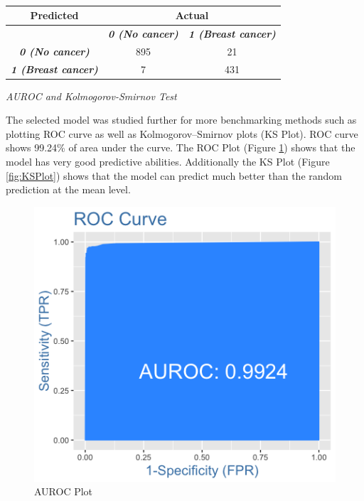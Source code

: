 \documentclass{bioinfo}
\begin{document}
\begin{table}[htb]
\centering
\caption{}
\label{tab:conf-matrix}
\begin{tabular}{@{}ccc@{}}
\toprule
\textbf{Predicted}                  & \multicolumn{2}{c}{\textbf{Actual}}                                   \\ \midrule
\textit{\textbf{}}                  & \textit{\textbf{0 (No cancer)}} & \textit{\textbf{1 (Breast cancer)}} \\
\textit{\textbf{0 (No cancer)}}     & 895                             & 21                                  \\
\textit{\textbf{1 (Breast cancer)}} & 7                               & 431                                 \\ \bottomrule
\end{tabular}
\end{table}


{\it AUROC and Kolmogorov-Smirnov Test}

The selected model was studied further for more benchmarking methods such as plotting ROC curve as well as Kolmogorov–Smirnov plots (KS Plot). ROC curve shows 99.24\% of area under the curve. The ROC Plot (Figure \ref{fig:AUROC}) shows that the model has very good predictive abilities. Additionally the KS Plot (Figure \ref{fig:KSPlot}) shows that the model can predict much better than the random prediction at the mean level. 



\begin{figure}[htbp]
\centering
\includegraphics[scale=0.55]{ROC-Plot.png}
\caption{AUROC Plot}
\label{fig:AUROC}
\end{figure}
\end{document}
